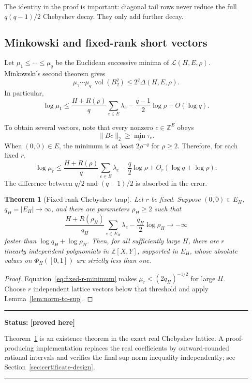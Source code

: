 \documentclass[11pt,oneside]{article}
\newtheorem{theorem}{Theorem}[section]
\theoremstyle{definition}
\theoremstyle{remark}
\newcommand{\Z}{\mathbb Z}
\newcommand{\cL}{\mathcal L}
\newcommand{\vol}{\operatorname{vol}}
\newcommand{\statusproved}{\textcolor{provedgreen}{\textbf{[proved here]}}}
\newenvironment{statusbox}[1]
{\begin{center}\begin{minipage}{0.94\textwidth}\raggedright\hrule\vspace{0.45em}\textbf{Status:} #1\par\vspace{0.35em}}
{\vspace{0.35em}\hrule\end{minipage}\end{center}}
\begin{document}
The identity in the proof is important: diagonal tail rows never reduce the full
$q(q-1)/2$ Chebyshev decay.  They only add further decay.

\subsection{Minkowski and fixed-rank short vectors}

Let $\mu_1\le\cdots\le\mu_q$ be the Euclidean successive minima of $\cL(H,E,\rho)$.
Minkowski's second theorem gives
\[
 \mu_1\cdots\mu_q\,\vol(B_2^q)\le2^q\Delta(H,E,\rho).
\]
In particular,
\begin{equation}
 \log\mu_1
 \le \frac{H+R(\rho)}q\sum_{e\in E}\lambda_e
      -\frac{q-1}{2}\log\rho+O(\log q).
 \label{eq:first-minimum}
\end{equation}

To obtain several vectors, note that every nonzero $c\in\Z^E$ obeys
\[
 \|Bc\|_2\ge\min_e\tau_e.
\]
When $(0,0)\in E$, the minimum is at least $2\rho^{-q}$ for $\rho\ge2$.  Therefore, for each
fixed $r$,
\begin{equation}
 \log\mu_r
 \le \frac{H+R(\rho)}q\sum_{e\in E}\lambda_e
      -\frac q2\log\rho+O_r(\log q+\log\rho).
 \label{eq:fixed-r-minimum}
\end{equation}
The difference between $q/2$ and $(q-1)/2$ is absorbed in the error.

\begin{theorem}[Fixed-rank Chebyshev trap]
\label{thm:fixed-rank-trap}
Let $r$ be fixed.  Suppose $(0,0)\in E_H$, $q_H=|E_H|\to\infty$, and there are parameters
$\rho_H\ge2$ such that
\begin{equation}
 \frac{H+R(\rho_H)}{q_H}\sum_{e\in E_H}\lambda_e
 -\frac{q_H}{2}\log\rho_H\longrightarrow-\infty
 \label{eq:shortness-criterion}
\end{equation}
faster than $\log q_H+\log\rho_H$.  Then, for all sufficiently large $H$, there are $r$
linearly independent polynomials in $\Z[X,Y]$, supported in $E_H$, whose absolute values on
$\Phi_H([0,1])$ are strictly less than one.
\end{theorem}

\begin{proof}
Equation~\eqref{eq:fixed-r-minimum} makes $\mu_r<(2q_H)^{-1/2}$ for large $H$.  Choose $r$
independent lattice vectors below that threshold and apply Lemma~\ref{lem:norm-to-sup}.
\end{proof}

\begin{statusbox}{\statusproved}
Theorem~\ref{thm:fixed-rank-trap} is an existence theorem in the exact real Chebyshev lattice.
A proof-producing implementation replaces the real coefficients by outward-rounded rational
intervals and verifies the final sup-norm inequality independently; see
Section~\ref{sec:certificate-design}.
\end{statusbox}
\end{document}
